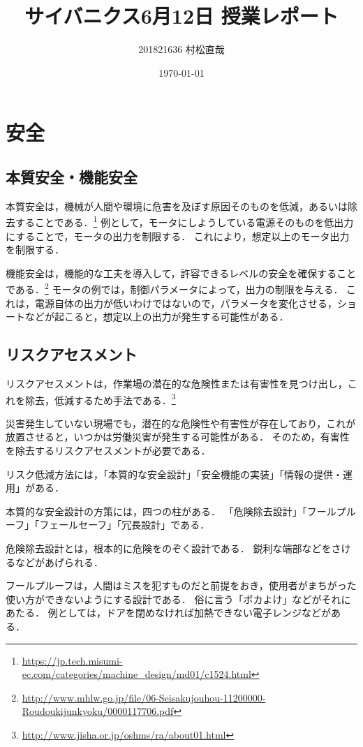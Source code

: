 \documentclass[uplatex,a4paper]{jsarticle}
\title{サイバニクス6月12日 授業レポート}
\author{201821636 村松直哉}
\date{\today}
\begin{document}
\maketitle
%
%
\section{安全}
\subsection{本質安全・機能安全}
本質安全は，機械が人間や環境に危害を及ぼす原因そのものを低減，あるいは除去することである．\footnote{\url{https://jp.tech.misumi-ec.com/categories/machine_design/md01/c1524.html}}
例として，モータにしようしている電源そのものを低出力にすることで，モータの出力を制限する．
これにより，想定以上のモータ出力を制限する．

機能安全は，機能的な工夫を導入して，許容できるレベルの安全を確保することである．\footnote{\url{http://www.mhlw.go.jp/file/06-Seisakujouhou-11200000-Roudoukijunkyoku/0000117706.pdf}}
モータの例では，制御パラメータによって，出力の制限を与える．
これは，電源自体の出力が低いわけではないので，パラメータを変化させる，ショートなどが起こると，想定以上の出力が発生する可能性がある．


\subsection{リスクアセスメント}
リスクアセスメントは，作業場の潜在的な危険性または有害性を見つけ出し，これを除去，低減するため手法である．\footnote{\url{http://www.jisha.or.jp/oshms/ra/about01.html}}

災害発生していない現場でも，潜在的な危険性や有害性が存在しており，これが放置させると，いつかは労働災害が発生する可能性がある．
そのため，有害性を除去するリスクアセスメントが必要である．

リスク低減方法には，「本質的な安全設計」「安全機能の実装」「情報の提供・運用」がある．


本質的な安全設計の方策には，四つの柱がある．
「危険除去設計」「フールプルーフ」「フェールセーフ」「冗長設計」である．

危険除去設計とは，根本的に危険をのぞく設計である．
鋭利な端部などをさけるなどがあげられる．

フールプルーフは，人間はミスを犯すものだと前提をおき，使用者がまちがった使い方ができないようにする設計である．
俗に言う「ポカよけ」などがそれにあたる．
例としては，ドアを閉めなければ加熱できない電子レンジなどがある．
\end{document}
